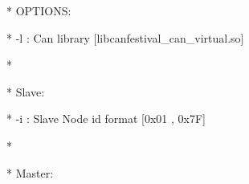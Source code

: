 \documentclass[a4paper,12pt]{book}
\begin{document}
{\ttfamily
* \space \space OPTIONS:
\space \space \space \space \space \space \space \space \space \space \space \space \space \space \space \space \space \space \space \space \space \space \space \space \space \space \space \space \space \space \space \space \space \space \space \space \space \space \space \space \space \space \space \space \space \space \space \space *}

{\ttfamily
* \space \space \space \space {}-l : Can library
[{\textquotedbl}libcanfestival\_can\_virtual.so{\textquotedbl}]
\space \space \space \space *}

{\ttfamily
*
\space \space \space \space \space \space \space \space \space \space \space \space \space \space \space \space \space \space \space \space \space \space \space \space \space \space \space \space \space \space \space \space \space \space \space \space \space \space \space \space \space \space \space \space \space \space \space \space \space \space \space \space \space \space \space \space \space \space \space *}

{\ttfamily
* \space \space \space Slave:
\space \space \space \space \space \space \space \space \space \space \space \space \space \space \space \space \space \space \space \space \space \space \space \space \space \space \space \space \space \space \space \space \space \space \space \space \space \space \space \space \space \space \space \space \space \space \space \space \space *}

{\ttfamily
* \space \space \space \space {}-i : Slave Node id format [0x01 , 0x7F]
\space \space \space \space \space \space \space \space \space \space \space \space \space \space \space *}

{\ttfamily
*
\space \space \space \space \space \space \space \space \space \space \space \space \space \space \space \space \space \space \space \space \space \space \space \space \space \space \space \space \space \space \space \space \space \space \space \space \space \space \space \space \space \space \space \space \space \space \space \space \space \space \space \space \space \space \space \space \space \space \space *}

{\ttfamily
* \space \space \space Master:
\space \space \space \space \space \space \space \space \space \space \space \space \space \space \space \space \space \space \space \space \space \space \space \space \space \space \space \space \space \space \space \space \space \space \space \space \space \space \space \space \space \space \space \space \space \space \space \space *}
\end{document}
